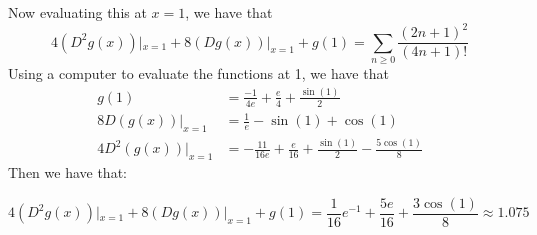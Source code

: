 \documentclass[]{article}
\begin{document}
Now evaluating this at $x = 1$, we have that
\begin{equation}
	4 (D^2 g(x))|_{x = 1} + 8 (D g(x))|_{x = 1} + g(1) = \sum_{n \geq 0}\frac{(2n + 1)^2}{(4n + 1)!}
\end{equation}
Using a computer to evaluate the functions at 1, we have that
\begin{align*}
	g(1) &= \frac{-1}{4e} + \frac{e}{4} + \frac{\sin(1)}{2}\\
	8D(g(x))|_{x = 1} &= \frac{1}{e} - \sin(1) + \cos(1)\\
	4 D^2(g(x))|_{x = 1} &= -\frac{11}{16e} + \frac{e}{16} + \frac{\sin(1)}{2} - \frac{5 \cos(1)}{8}
\end{align*}
Then we have that:

\begin{equation}
	4 (D^2 g(x))|_{x = 1} + 8 (D g(x))|_{x = 1} + g(1) = \frac{1}{16}e^{-1} + \frac{5e}{16} + \frac{3 \cos(1)}{8}\approx 1.075
\end{equation}
\end{document}

